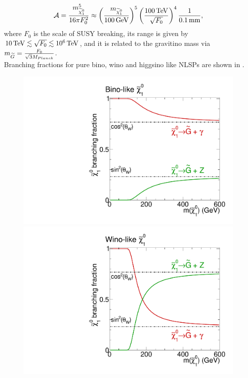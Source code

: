 \begin{equation}
 \mathcal{A} = \frac{m_{\widetilde{\chi}^{0}_{1}}^5}{16\pi F_{0}^{2}}\approx\left(\frac{m_{\widetilde{\chi}^{0}_{1}}}{100\,\text{Ge\hspace{-.08em}V}}\right)^5\left(\frac{100\,\text{Te\hspace{-.08em}V}}{\sqrt{F_0}}\right)^4 \frac{1}{0.1\,\text{mm}},
\end{equation}
where $F_0$ is the scale of SUSY breaking, its  range is given by $10\,\text{Te\hspace{-.08em}V}\lesssim\sqrt{F_0}\lesssim10^6\,\text{Te\hspace{-.08em}V}$, and it is related to the gravitino mass via $m_{\widetilde{G}}=\frac{F_0}{\sqrt{3}M_{Planck}}$.\\
Branching fractions for pure bino, wino and higgsino like NLSPs are shown in .
\begin{figure}[htb]
 \centering
 \includegraphics[width=\pairwidth]{figures/signal/binoBranching}
 \includegraphics[width=\pairwidth]{figures/signal/winoBranching}\\

\end{figure}
